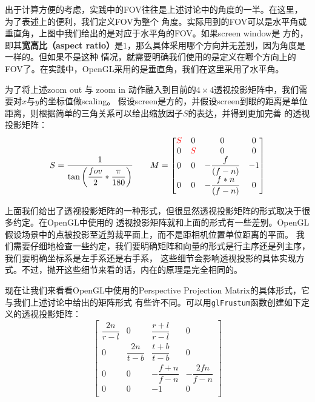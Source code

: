 \documentclass[12pt]{article}
\begin{document}
\indent{}出于计算方便的考虑，实践中的FOV往往是上述讨论中的角度的一半。在这里，为了表述上的便利，我们定义FOV为整个
角度。实际用到的FOV可以是水平角或垂直角，上图中我们给出的是对应于水平角的FOV。如果screen window是
方的，即其\textbf{宽高比（aspect ratio）}是$1$，那么具体采用哪个方向并无差别，因为角度是一样的。但如果不是这种
情况，就需要明确我们使用的是定义在哪个方向上的FOV了。在实践中，OpenGL采用的是垂直角，我们在这里采用了水平角。

\indent{}为了将上述zoom out 与 zoom in 动作融入到目前的$4\times 4$透视投影矩阵中，我们需要对$x$与$y$的坐标值做scaling。
假设screen是方的，并假设screen到眼的距离是单位距离，则根据简单的三角关系可以给出缩放因子$S$的表达，并得到更加完善
的透视投影矩阵：
\begin{displaymath}
S = \frac{1}{\tan\bigg(\dfrac{fov}{2} * \dfrac{\pi}{180}\bigg)}
\quad\quad
M=
\begin{bmatrix}
\color{red}{S} & 0 & 0 & 0 \\
0 & \color{red}{S} & 0 & 0 \\
0 & 0 & -\dfrac{f}{(f-n)} & -1\\
0 & 0 & -\dfrac{f*n}{(f-n)}& 0\\
\end{bmatrix}
\end{displaymath}

\indent{}上面我们给出了透视投影矩阵的一种形式，但很显然透视投影矩阵的形式取决于很多约定。在OpenGL中使用的
透视投影矩阵就和上面的形式有一些差别。OpenGL假设场景中的点被投影至近剪裁平面上，而不是距相机位置单位距离的平面。
我们需要仔细地检查一些约定，我们要明确矩阵和向量的形式是行主序还是列主序，我们要明确坐标系是左手系还是右手系，
这些细节会影响透视投影的具体实现方式。不过，抛开这些细节来看的话，内在的原理是完全相同的。

\indent{}现在让我们来看看OpenGL中使用的Perspective Projection Matrix的具体形式，它与我们上述讨论中给出的矩阵形式
有些许不同。可以用\texttt{glFrustum}函数创建如下定义的透视投影矩阵：
\begin{displaymath}
\left[\begin{array}{cccc}
{ \dfrac{2n}{ r-l } } & 0 & { \dfrac{r + l} { r-l } } & 0 \\
0 & { \dfrac{2n}{ t-b } } & { \dfrac{t + b}{ t-b } } & 0 \\
0 & 0 & -{\dfrac{f+n}{f-n}} & -{\dfrac{2fn}{f-n}}\\
0 & 0 & -1& 0\\
\end{array}\right]
\end{displaymath}
\end{document}
